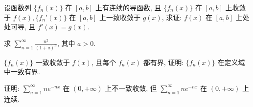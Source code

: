 \par
设函数列 $\{f_n(x)\}$ 在 $[a, b]$ 上有连续的导函数, 且 $\{f_n(x)\}$ 在 $[a, b]$ 上收敛于 $f(x), \{f_n'(x)\}$ 在 $[a, b]$ 上一致收敛于 $g(x)$, 求证: $f(x)$ 在 $[a, b]$ 上处处可导, 且 $f'(x) = g(x)$.\par
求 $\sum_{n=1}^{\infty} \frac{n^2}{(1+a)^n}$, 其中 $a > 0$.\par
$\{f_n(x)\}$ 一致收敛于 $f(x)$, 且每个 $f_n(x)$ 都有界, 证明: $\{f_n(x)\}$ 在定义域中一致有界.\par
证明: $\sum_{n=1}^{\infty} ne^{-nx}$ 在 $(0, +\infty)$ 上不一致收敛, 但 $\sum_{n=1}^{\infty} ne^{-nx}$ 在 $(0, +\infty)$ 上连续.\par
